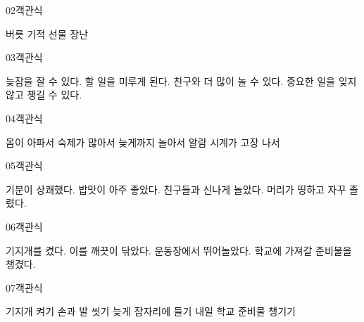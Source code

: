 \documentclass[fs13,seriesSau]{korfarm-base}
\begin{document}
\begin{kfQBlock}{02}{객관식}
\begin{kfChoices}
\kfChoice 버릇
\kfChoice 기적
\kfChoice 선물
\kfChoice 장난
\end{kfChoices}
\end{kfQBlock}

\begin{kfQBlock}{03}{객관식}
\begin{kfChoices}
\kfChoice 늦잠을 잘 수 있다.
\kfChoice 할 일을 미루게 된다.
\kfChoice 친구와 더 많이 놀 수 있다.
\kfChoice 중요한 일을 잊지 않고 챙길 수 있다.
\end{kfChoices}
\end{kfQBlock}

\begin{kfQBlock}{04}{객관식}
\begin{kfChoices}
\kfChoice 몸이 아파서
\kfChoice 숙제가 많아서
\kfChoice 늦게까지 놀아서
\kfChoice 알람 시계가 고장 나서
\end{kfChoices}
\end{kfQBlock}

\begin{kfQBlock}{05}{객관식}
\begin{kfChoices}
\kfChoice 기분이 상쾌했다.
\kfChoice 밥맛이 아주 좋았다.
\kfChoice 친구들과 신나게 놀았다.
\kfChoice 머리가 띵하고 자꾸 졸렸다.
\end{kfChoices}
\end{kfQBlock}

\begin{kfQBlock}{06}{객관식}
\begin{kfChoices}
\kfChoice 기지개를 켰다.
\kfChoice 이를 깨끗이 닦았다.
\kfChoice 운동장에서 뛰어놀았다.
\kfChoice 학교에 가져갈 준비물을 챙겼다.
\end{kfChoices}
\end{kfQBlock}

\begin{kfQBlock}{07}{객관식}
\begin{kfChoices}
\kfChoice 기지개 켜기
\kfChoice 손과 발 씻기
\kfChoice 늦게 잠자리에 들기
\kfChoice 내일 학교 준비물 챙기기
\end{kfChoices}
\end{kfQBlock}
\end{document}
